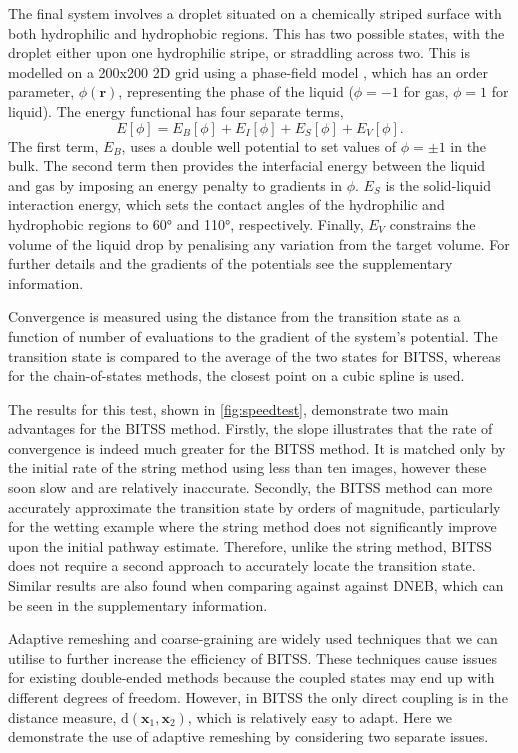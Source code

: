\documentclass[aps,prl,twocolumn,10pt,groupedaddress]{revtex4-2}
\begin{document}
The final system involves a droplet situated on a chemically striped surface with both hydrophilic and hydrophobic regions.
This has two possible states, with the droplet either upon one hydrophilic stripe, or straddling across two.
This is modelled on a 200x200 2D grid using a phase-field model \cite{Panter2019b}, which has an order parameter, $\phi(\bm{r})$, representing the phase of the liquid ($\phi=-1$ for gas, $\phi=1$ for liquid).
The energy functional has four separate terms,
\begin{equation} \label{eq:phasefield}
  E[\phi] = E_B[\phi] + E_I[\phi] + E_S[\phi] + E_V[\phi].
\end{equation}
The first term, $E_B$, uses a double well potential to set values of $\phi=\pm1$ in the bulk.
The second term then provides the interfacial energy between the liquid and gas by imposing an energy penalty to gradients in $\phi$.
$E_S$ is the solid-liquid interaction energy, which sets the contact angles of the hydrophilic and hydrophobic regions to 60\si{\degree} and 110\si{\degree}, respectively.
Finally, $E_V$ constrains the volume of the liquid drop by penalising any variation from the target volume.
For further details and the gradients of the potentials see the supplementary information.

Convergence is measured using the distance from the transition state as a function of number of evaluations to the gradient of the system's potential.
The transition state is compared to the average of the two states for BITSS, whereas for the chain-of-states methods, the closest point on a cubic spline is used.

The results for this test, shown in \cref{fig:speedtest}, demonstrate two main advantages for the BITSS method.
Firstly, the slope illustrates that the rate of convergence is indeed much greater for the BITSS method.
It is matched only by the initial rate of the string method using less than ten images, however these soon slow and are relatively inaccurate.
Secondly, the BITSS method can more accurately approximate the transition state by orders of magnitude, particularly for the wetting example where the string method does not significantly improve upon the initial pathway estimate.
Therefore, unlike the string method, BITSS does not require a second approach to accurately locate the transition state.
Similar results are also found when comparing against against DNEB, which can be seen in the supplementary information.


Adaptive remeshing and coarse-graining are widely used techniques that we can utilise to further increase the efficiency of BITSS.
These techniques cause issues for existing double-ended methods because the coupled states may end up with different degrees of freedom.
However, in BITSS the only direct coupling is in the distance measure, $\mathrm{d}(\bm{x}_1,\bm{x}_2)$, which is relatively easy to adapt.
Here we demonstrate the use of adaptive remeshing by considering two separate issues.
\end{document}
